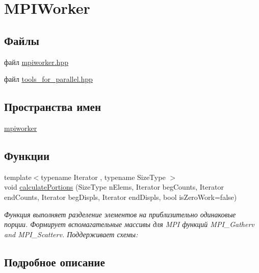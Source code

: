 \hypertarget{group__MPIWorker}{\section{M\-P\-I\-Worker}
\label{group__MPIWorker}
}
\subsection*{Файлы}
\begin{DoxyCompactItemize}
\item 
файл \hyperlink{mpiworker_8hpp}{mpiworker.\-hpp}
\item 
файл \hyperlink{tools__for__parallel_8hpp}{tools\-\_\-for\-\_\-parallel.\-hpp}
\end{DoxyCompactItemize}
\subsection*{Пространства имен}
\begin{DoxyCompactItemize}
\item 
\hyperlink{namespacempiworker}{mpiworker}
\end{DoxyCompactItemize}
\subsection*{Функции}
\begin{DoxyCompactItemize}
\item 
{\footnotesize template$<$typename Iterator , typename Size\-Type $>$ }\\void \hyperlink{group__MPIWorker_ga6fd8303c1b4e39a4a623756fdcbeae6f}{calculate\-Portions} (Size\-Type n\-Elems, Iterator beg\-Counts, Iterator end\-Counts, Iterator beg\-Displs, Iterator end\-Displs, bool is\-Zero\-Work=false)
\begin{DoxyCompactList}\small\item\em Функция выполняет разделение элементов на приблизительно одинаковые порции. Формирует вспомагательные массивы для M\-P\-I функций M\-P\-I\-\_\-\-Gatherv and M\-P\-I\-\_\-\-Scatterv. Поддерживает схемы\-: \end{DoxyCompactList}\end{DoxyCompactItemize}


\subsection{Подробное описание}


